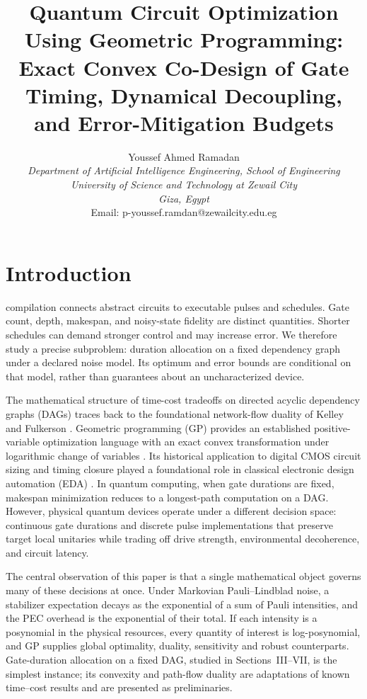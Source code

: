 \documentclass[10pt,letterpaper,journal]{IEEEtran}
\title{{\fontsize{17}{20}\selectfont\bfseries Quantum Circuit Optimization Using Geometric Programming:\\ Exact Convex Co-Design of Gate Timing, Dynamical Decoupling, and Error-Mitigation Budgets}}
\author{{\fontsize{11}{13}\selectfont Youssef Ahmed Ramadan}\\[3pt]
{\fontsize{10}{12}\selectfont\itshape Department of Artificial Intelligence Engineering, School of Engineering}\\
{\fontsize{10}{12}\selectfont\itshape University of Science and Technology at Zewail City}\\
{\fontsize{10}{12}\selectfont\itshape Giza, Egypt}\\
{\fontsize{10}{12}\selectfont Email: p-youssef.ramdan@zewailcity.edu.eg}}
\begin{document}
\maketitle


\section{Introduction}
 compilation connects abstract circuits to executable pulses and schedules. Gate count, depth, makespan, and noisy-state fidelity are distinct quantities. Shorter schedules can demand stronger control and may increase error. We therefore study a precise subproblem: duration allocation on a fixed dependency graph under a declared noise model. Its optimum and error bounds are conditional on that model, rather than guarantees about an uncharacterized device.

The mathematical structure of time-cost tradeoffs on directed acyclic dependency graphs (DAGs) traces back to the foundational network-flow duality of Kelley \cite{kelley} and Fulkerson \cite{fulkerson}. Geometric programming (GP) provides an established positive-variable optimization language with an exact convex transformation under logarithmic change of variables \cite{boydgp}. Its historical application to digital CMOS circuit sizing and timing closure played a foundational role in classical electronic design automation (EDA) \cite{boyddigital}. In quantum computing, when gate durations are fixed, makespan minimization reduces to a longest-path computation on a DAG. However, physical quantum devices operate under a different decision space: continuous gate durations and discrete pulse implementations that preserve target local unitaries while trading off drive strength, environmental decoherence, and circuit latency.

The central observation of this paper is that a single mathematical object governs many of these decisions at once. Under Markovian Pauli--Lindblad noise, a stabilizer expectation decays as the exponential of a sum of Pauli intensities, and the PEC overhead is the exponential of their total. If each intensity is a posynomial in the physical resources, every quantity of interest is log-posynomial, and GP supplies global optimality, duality, sensitivity and robust counterparts. Gate-duration allocation on a fixed DAG, studied in Sections~III--VII, is the simplest instance; its convexity and path-flow duality are adaptations of known time--cost results and are presented as preliminaries.
\end{document}
